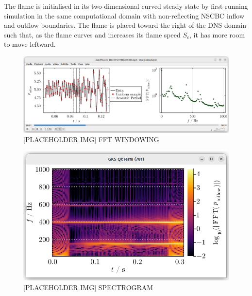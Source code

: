 The flame is initialised in its two-dimensional curved steady state by first running simulation in the same computational domain with non-reflecting NSCBC inflow and outflow boundaries. The flame is placed toward the right of the DNS domain such that, as the flame curves and increases its flame speed $S_c$, it has more room to move leftward.












\begin{figure}[t]
\centering
\includegraphics[scale=0.35]{assets/graphs/fft-windowing.png}
\caption{[PLACEHOLDER IMG] FFT WINDOWING}
\label{fig:windowing}
\end{figure}

\begin{figure}[t]
\centering
\includegraphics[scale=0.35]{assets/graphs/spectrogram.png}
\caption{[PLACEHOLDER IMG] SPECTROGRAM}
\label{fig:spectrogram}
\end{figure}

